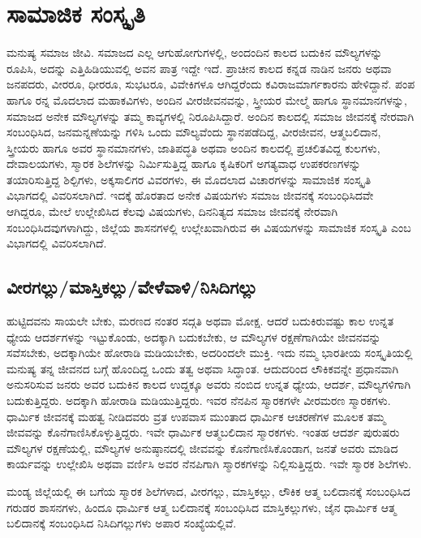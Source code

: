 
\chapter{ಸಾಮಾಜಿಕ ಸಂಸ್ಕೃತಿ}

ಮನುಷ್ಯ ಸಮಾಜ ಜೀವಿ. ಸಮಾಜದ ಎಲ್ಲ ಆಗುಹೋಗುಗಳಲ್ಲಿ, ಅಂದಂದಿನ ಕಾಲದ ಬದುಕಿನ ಮೌಲ್ಯಗಳನ್ನು ರೂಪಿಸಿ, ಅದನ್ನು ಎತ್ತಿಹಿಡಿಯುವಲ್ಲಿ ಅವನ ಪಾತ್ರ ಇದ್ದೇ ಇದೆ. ಪ್ರಾಚೀನ ಕಾಲದ ಕನ್ನಡ ನಾಡಿನ ಜನರು ಅಥವಾ ಜನಪದರು, ವೀರರೂ, ಧೀರರೂ, ಸುಭಟರೂ, ವಿವೇಕಿಗಳೂ ಆಗಿದ್ದರೆಂದು ಕವಿರಾಜಮಾರ್ಗಕಾರನು ಹೇಳಿದ್ದಾನೆ. ಪಂಪ ಹಾಗೂ ರನ್ನ ಮೊದಲಾದ ಮಹಾಕವಿಗಳು, ಅಂದಿನ ವೀರಜೀವನವನ್ನು, ಸ್ತ್ರೀಯರ ಮೇಲ್ಮೆ ಹಾಗೂ ಸ್ಥಾನಮಾನಗಳನ್ನು, ಸಮಾಜದ ಅನೇಕ ಮೌಲ್ಯಗಳನ್ನು ತಮ್ಮ ಕಾವ್ಯಗಳಲ್ಲಿ ನಿರೂಪಿಸಿದ್ದಾರೆ. ಅಂದಿನ ಕಾಲದಲ್ಲಿ ಸಮಾಜ ಜೀವನಕ್ಕೆ ನೇರವಾಗಿ ಸಂಬಂಧಿಸಿದ, ಜನಮನ್ನಣೆಯನ್ನು ಗಳಿಸಿ ಒಂದು ಮೌಲ್ಯವೆಂದು ಸ್ಥಾನಪಡೆದಿದ್ದ, ವೀರಜೀವನ, ಆತ್ಮಬಲಿದಾನ, ಸ್ತ್ರೀಯರು ಹಾಗೂ ಅವರ ಸ್ಥಾನಮಾನಗಳು, ಜಾತಿ\-ಪದ್ಧತಿ ಅಥವಾ ಅಂದಿನ ಕಾಲದಲ್ಲಿ ಪ್ರಚಲಿತವಿದ್ದ ಕುಲಗಳು, ದೇವಾಲಯಗಳು, ಸ್ಮಾರಕ ಶಿಲೆಗಳನ್ನು ನಿರ್ಮಿಸುತ್ತಿದ್ದ ಹಾಗೂ ಕೃಷಿಕರಿಗೆ ಅಗತ್ಯವಾಧ ಉಪಕರಣಗಳನ್ನು ತಯಾರಿಸುತ್ತಿದ್ದ ಶಿಲ್ಪಿಗಳು, ಅಕ್ಕಸಾಲಿಗರ ವಿವರಗಳು, ಈ ಮೊದಲಾದ ವಿಚಾರಗಳನ್ನು ಸಾಮಾಜಿಕ ಸಂಸ್ಕೃತಿ ವಿಭಾಗದಲ್ಲಿ ವಿವರಿಸಲಾಗಿದೆ. ಇದಕ್ಕೆ ಹೊರತಾದ ಅನೇಕ ವಿಷಯಗಳು ಸಮಾಜ ಜೀವನಕ್ಕೆ ಸಂಬಂಧಿಸಿದವೇ ಆಗಿದ್ದರೂ, ಮೇಲೆ ಉಲ್ಲೇಖಿಸಿದ ಕೆಲವು ವಿಷಯಗಳು, ದಿನನಿತ್ಯದ ಸಮಾಜ ಜೀವನಕ್ಕೆ ನೇರವಾಗಿ ಸಂಬಂಧಿಸಿದವುಗಳಾಗಿದ್ದು, ಜಿಲ್ಲೆಯ ಶಾಸನಗಳಲ್ಲಿ ಉಲ್ಲೇಖವಾಗಿರುವ ಈ ವಿಷಯಗಳನ್ನು ಸಾಮಾಜಿಕ ಸಂಸ್ಕೃತಿ ಎಂಬ ವಿಭಾಗದಲ್ಲಿ ವಿವರಿಸಲಾಗಿದೆ.

\section{ವೀರಗಲ್ಲು/ಮಾಸ್ತಿಕಲ್ಲು/ವೇಳೆವಾಳಿ/ನಿಸಿದಿಗಲ್ಲು}

ಹುಟ್ಟಿದವನು ಸಾಯಲೇ ಬೇಕು, ಮರಣದ ನಂತರ ಸದ್ಗತಿ ಅಥವಾ ಮೋಕ್ಷ. ಆದರೆ ಬದುಕಿರುವಷ್ಟು ಕಾಲ ಉನ್ನತ ಧ್ಯೇಯ ಆದರ್ಶಗಳನ್ನು ಇಟ್ಟುಕೊಂಡು, ಅದಕ್ಕಾಗಿ ಬದುಕಬೇಕು, ಆ ಮೌಲ್ಯಗಳ ರಕ್ಷಣೆಗಾಗಿಯೇ ಜೀವನವನ್ನು ಸವೆಸಬೇಕು, ಅದಕ್ಕಾಗಿಯೇ ಹೋರಾಡಿ ಮಡಿಯಬೇಕು, ಅದರಿಂದಲೇ ಮುಕ್ತಿ. ಇದು ನಮ್ಮ ಭಾರತೀಯ ಸಂಸ್ಕೃತಿಯಲ್ಲಿ ಮನುಷ್ಯ ತನ್ನ ಜೀವನದ ಬಗ್ಗೆ ಹೊಂದಿದ್ದ ಒಂದು ತತ್ವ ಅಥವಾ ಸಿದ್ಧಾಂತ. ಆದುದರಿಂದ ಲೌಕಿಕವನ್ನೇ ಪ್ರಧಾನವಾಗಿ ಅನುಸರಿಸುವ ಜನರು ಅವರ ಬದುಕಿನ ಕಾಲದ ಉದ್ದಕ್ಕೂ ಅವರು ನಂಬಿದ ಉನ್ನತ ಧ್ಯೇಯ, ಆದರ್ಶ, ಮೌಲ್ಯಗಳಿಗಾಗಿ ಬದುಕುತ್ತಿದ್ದರು. ಅದಕ್ಕಾಗಿ ಹೋರಾಡಿ ಮಡಿಯುತ್ತಿದ್ದರು. ಇವರ ನೆನಪಿನ ಸ್ಮಾರಕಗಳೇ ವೀರಮರಣ ಸ್ಮಾರಕಗಳು. ಧಾರ್ಮಿಕ ಜೀವನಕ್ಕೆ ಮಹತ್ವ ನೀಡಿದವರು ವ್ರತ ಉಪವಾಸ ಮುಂತಾದ ಧಾರ್ಮಿಕ ಆಚರಣೆಗಳ ಮೂಲಕ ತಮ್ಮ ಜೀವವನ್ನು ಕೊನೆಗಾಣಿಸಿಕೊಳ್ಳುತ್ತಿದ್ದರು. ಇವೇ ಧಾರ್ಮಿಕ ಆತ್ಮಬಲಿದಾನ ಸ್ಮಾರಕಗಳು. ಇಂತಹ ಆದರ್ಶ ಪುರುಷರು ಮೌಲ್ಯಗಳ ರಕ್ಷಣೆಯಲ್ಲಿ, ಮೌಲ್ಯಗಳ ಅನುಷ್ಠಾನದಲ್ಲಿ ಜೀವವನ್ನು ಕೊನೆಗಾಣಿಸಿಕೊಂಡಾಗ, ಜನತೆ ಅವರು ಮಾಡಿದ ಕಾರ್ಯವನ್ನು ಉಲ್ಲೇಖಿಸಿ ಅಥವಾ ವರ್ಣಿಸಿ ಅವರ ನೆನಪಿಗಾಗಿ ಸ್ಮಾರಕಗಳನ್ನು ನಿಲ್ಲಿಸುತ್ತಿದ್ದರು. ಇವೇ ಸ್ಮಾರಕ ಶಿಲೆಗಳು.

ಮಂಡ್ಯ ಜಿಲ್ಲೆಯಲ್ಲಿ ಈ ಬಗೆಯ ಸ್ಮಾರಕ ಶಿಲೆಗಳಾದ, ವೀರಗಲ್ಲು, ಮಾಸ್ತಿಕಲ್ಲು, ಲೌಕಿಕ ಆತ್ಮ ಬಲಿದಾನಕ್ಕೆ ಸಂಬಂಧಿಸಿದ ಗರುಡರ ಶಾಸನಗಳು, ಹಿಂದೂ ಧಾರ್ಮಿಕ ಆತ್ಮ ಬಲಿದಾನಕ್ಕೆ ಸಂಬಂಧಿಸಿದ ಮಾಸ್ತಿಕಲ್ಲುಗಳು, ಜೈನ ಧಾರ್ಮಿಕ ಆತ್ಮ ಬಲಿದಾನಕ್ಕೆ ಸಂಬಂಧಿಸಿದ ನಿಸಿದಿಗಲ್ಲುಗಳು ಅಪಾರ ಸಂಖ್ಯೆಯಲ್ಲಿವೆ.

